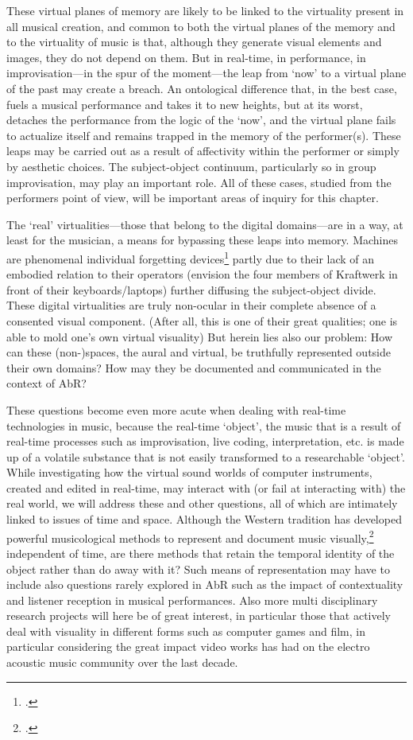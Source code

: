 \documentclass[a4paper]{article}
\begin{document}
These virtual planes of memory are likely to be linked to the virtuality present in all musical creation, and common to both the virtual planes of the memory and to the virtuality of music is that, although they generate visual elements and images, they do not depend on them.
But in real-time, in performance, in improvisation---in the spur of the moment---the leap from `now' to a virtual plane of the past may create a breach. An ontological difference that, in the best case, fuels a musical performance and takes it to new heights, but at its worst, detaches the performance from the logic of the `now', and the virtual plane fails to actualize itself and remains trapped in the memory of the performer(s). These leaps may be carried out as a result of affectivity within the performer or simply by aesthetic choices. The subject-object continuum, particularly so in group improvisation, may play an important role. 
All of these cases, studied from the performers point of view, will be important areas of inquiry for this chapter. %

The `real' virtualities---those that belong to the digital domains---are in a way, at least for the musician, a means for bypassing these leaps into memory. Machines are phenomenal individual forgetting devices\footcite[See][]{miller04} partly due to their lack of an embodied relation to their operators (envision the four members of Kraftwerk in front of their keyboards/laptops) further diffusing the subject-object divide. These digital virtualities are truly non-ocular in their complete absence of a consented visual component. (After all, this is one of their great qualities; one is able to mold one's own virtual visuality) But herein lies also our problem: 
How can these (non-)spaces, the aural and virtual, be truthfully represented outside their own domains? How may they be documented and communicated in the context of AbR?

These questions become even more acute when dealing with real-time technologies in music, because the real-time `object', the music that is a result of real-time processes such as improvisation, live coding, interpretation, etc. is made up of a volatile substance that is not easily transformed to a researchable `object'. While investigating how the virtual sound worlds of computer instruments, created and edited in real-time, may interact with (or fail at interacting with) the real world, we will address these and other questions, all of which are intimately linked to issues of time and space. Although the Western tradition has developed powerful musicological methods to represent and document music visually,\footcite[See]{bregman94} independent of time, are there methods that retain the temporal identity of the object rather than do away with it? Such means of representation may have to include also questions rarely explored in AbR such as the impact of contextuality and listener reception in musical performances. Also more multi disciplinary research projects will here be of great interest, in particular those that actively deal with visuality in different forms such as computer games and film, in particular considering the great impact video works has had on the electro acoustic music community over the last decade.
\end{document}
